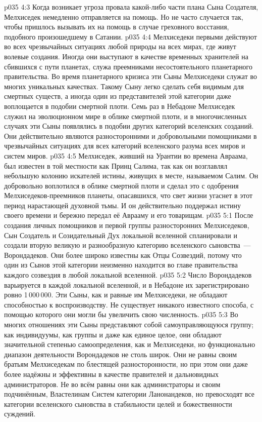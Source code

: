 \vs p035 4:3 Когда возникает угроза провала какой\hyp{}либо части плана Сына Создателя, Мелхиседек немедленно отправляется на помощь. Но не часто случается так, чтобы пришлось вызывать их на помощь в случае греховного восстания, подобного произошедшему в Сатании.
\vs p035 4:4 Мелхиседеки первыми действуют во всех чрезвычайных ситуациях любой природы на всех мирах, где живут волевые создания. Иногда они выступают в качестве временных хранителей на сбившихся с пути планетах, служа преемниками несостоятельного планетарного правительства. Во время планетарного кризиса эти Сыны Мелхиседеки служат во многих уникальных качествах. Такому Сыну легко сделать себя видимым для смертных существ, а иногда один из представителей этой категории даже воплощается в подобии смертной плоти. Семь раз в Небадоне Мелхиседек служил на эволюционном мире в облике смертной плоти, и в многочисленных случаях эти Сыны появлялись в подобии других категорий вселенских созданий. Они действительно являются разносторонними и добровольными помощниками в чрезвычайных ситуациях для всех категорий вселенского разума всех миров и систем миров.
\vs p035 4:5 \pc Мелхиседек, живший на Урантии во времена Авраама, был известен в той местности как Принц Салима, так как он возглавлял небольшую колонию искателей истины, живущих в месте, называемом Салим. Он добровольно воплотился в облике смертной плоти и сделал это с одобрения Мелхиседеков\hyp{}преемников планеты, опасавшихся, что свет жизни угаснет в этот период нарастающей духовной тьмы. И он действительно поддержал истину своего времени и бережно передал её Аврааму и его товарищам.
\vs p035 5:1 После создания личных помощников и первой группы разносторонних Мелхиседеков, Сын Создатель и Созидательный Дух локальной вселенной спланировали и создали вторую великую и разнообразную категорию вселенского сыновства~--- Ворондадеков. Они более широко известны как Отцы Созвездий, потому что один из Сынов этой категории неизменно находится во главе правительства каждого созвездия в любой локальной вселенной.
\vs p035 5:2 \pc Число Ворондадеков варьируется в каждой локальной вселенной, и в Небадоне их зарегистрировано ровно 1\,000\,000. Эти Сыны, как и равные им Мелхиседеки, не обладают способностью к воспроизводству. Не существует никакого известного способа, с помощью которого они могли бы увеличить свою численность.
\vs p035 5:3 \pc Во многих отношениях эти Сыны представляют собой самоуправляющуюся группу; как индивидуумы, как группы и даже как единое целое, они обладают значительной степенью самоопределения, как и Мелхиседеки, но функционально диапазон деятельности Ворондадеков не столь широк. Они не равны своим братьям Мелхиседекам по блестящей разносторонности, но при этом они даже более надёжны и эффективны в качестве правителей и дальновидных администраторов. Не во всём равны они как администраторы и своим подчинённым, Властелинам Систем категории Ланонандеков, но превосходят все категории вселенского сыновства в стабильности целей и божественности суждений.
